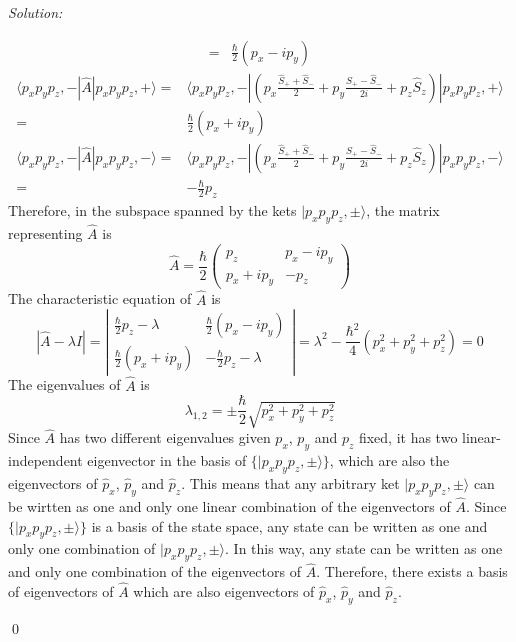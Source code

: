 \documentclass[10pt,a4paper]{article}
\newenvironment{sol}
    {\emph{Solution:}
    }
    {
    \qed
    }
\begin{document}
\begin{sol}
\begin{itemize}
\begin{align}
=&\frac{\hbar}{2}(p_x-ip_y)
\end{align}
\begin{align}
\nonumber\langle p_xp_yp_z,-|\hat{A}|p_xp_yp_z,+\rangle=&\langle p_xp_yp_z,-|(p_x\frac{\hat{S}_++\hat{S}_-}{2}+p_y\frac{\hat{S}_+-\hat{S}_-}{2i}+p_z\hat{S}_z)|p_xp_yp_z,+\rangle\\
=&\frac{\hbar}{2}(p_x+ip_y)
\end{align}
\begin{align}
\nonumber\langle p_xp_yp_z,-|\hat{A}|p_xp_yp_z,-\rangle=&\langle p_xp_yp_z,-|(p_x\frac{\hat{S}_++\hat{S}_-}{2}+p_y\frac{\hat{S}_+-\hat{S}_-}{2i}+p_z\hat{S}_z)|p_xp_yp_z,-\rangle\\
=&-\frac{\hbar}{2}p_z
\end{align}
Therefore, in the subspace spanned by the kets $|p_xp_yp_z,\pm\rangle$, the matrix representing $\hat{A}$ is
\begin{equation}
\hat{A}=\frac{\hbar}{2}\left(\begin{array}{cc}
p_z&p_x-ip_y\\
p_x+ip_y&-p_z
\end{array}\right)
\end{equation}
The characteristic equation of $\hat{A}$ is
\begin{equation}
|\hat{A}-\lambda I|=\left|\begin{array}{cc}
\frac{\hbar}{2}p_z-\lambda&\frac{\hbar}{2}(p_x-ip_y)\\
\frac{\hbar}{2}(p_x+ip_y)&-\frac{\hbar}{2}p_z-\lambda
\end{array}\right|=\lambda^2-\frac{\hbar^2}{4}(p_x^2+p_y^2+p_z^2)=0
\end{equation}
The eigenvalues of $\hat{A}$ is
\begin{equation}
\lambda_{1,2}=\pm\frac{\hbar}{2}\sqrt{p_x^2+p_y^2+p_z^2}
\end{equation}
Since $\hat{A}$ has two different eigenvalues given $p_x$, $p_y$ and $p_z$ fixed, it has two linear-independent eigenvector in the basis of $\{|p_xp_yp_z,\pm\rangle\}$, which are also the eigenvectors of $\hat{p}_x$, $\hat{p}_y$ and $\hat{p}_z$. This means that any arbitrary ket $|p_xp_yp_z,\pm\rangle$ can be wirtten as one and only one linear combination of the eigenvectors of $\hat{A}$. Since $\{|p_xp_yp_z,\pm\rangle\}$ is a basis of the state space, any state can be written as one and only one combination of $|p_xp_yp_z,\pm\rangle$. In this way, any state can be written as one and only one combination of the eigenvectors of $\hat{A}$. Therefore, there exists a basis of eigenvectors of $\hat{A}$ which are also eigenvectors of $\hat{p}_x$, $\hat{p}_y$ and $\hat{p}_z$.

\end{itemize}
\end{sol}
\end{document}
